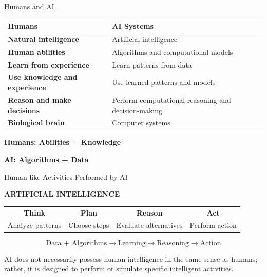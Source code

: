 \documentclass[aspectratio=169]{beamer}
\begin{document}
\begin{frame}{Humans and AI}

\begin{center}
\begin{tabular}{>{\bfseries}m{4cm} m{5.5cm}}
\toprule
Humans & AI Systems \\
\midrule
Natural intelligence & Artificial intelligence \\
Human abilities & Algorithms and computational models \\
Learn from experience & Learn patterns from data \\
Use knowledge and experience & Use learned patterns and models \\
Reason and make decisions & Perform computational reasoning and decision-making \\
Biological brain & Computer systems \\
\bottomrule
\end{tabular}
\end{center}

\vspace{0.4cm}

\begin{center}
\textbf{Humans: Abilities + Knowledge}

\textbf{AI: Algorithms + Data}
\end{center}
\end{frame}

\begin{frame}{Human-like Activities Performed by AI}

\begin{center}
\Large
\textbf{ARTIFICIAL INTELLIGENCE}
\end{center}

\vspace{0.3cm}

\begin{center}
\begin{tabular}{c c c c}
\textbf{Think} & \textbf{Plan} & \textbf{Reason} & \textbf{Act} \\
Analyze patterns & Choose steps & Evaluate alternatives & Perform action
\end{tabular}
\end{center}

\vspace{0.5cm}

\begin{center}
\[
\boxed{
\text{Data + Algorithms}
\rightarrow
\text{Learning}
\rightarrow
\text{Reasoning}
\rightarrow
\text{Action}
}
\]
\end{center}

AI does not necessarily possess human intelligence in the same
sense as humans; rather, it is designed to perform or simulate
specific intelligent activities.
\end{frame}
\end{document}
